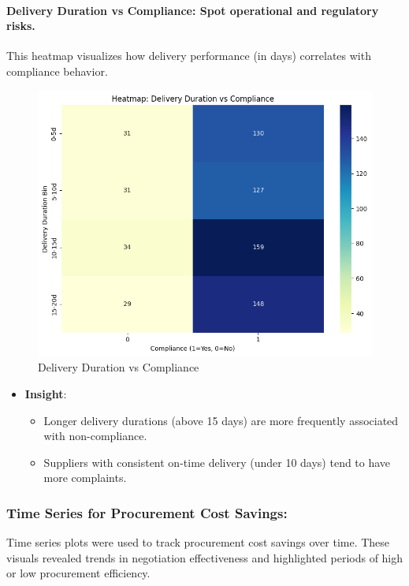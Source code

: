 \documentclass[10pt, twocolumn]{article}
\begin{document}
\paragraph{Delivery Duration vs Compliance: Spot operational and regulatory risks.} 
This heatmap visualizes how delivery performance (in days) correlates with compliance behavior.
\begin{figure}[H]
    \centering
    \includegraphics[width=1\linewidth]{Images/heatmap_delivery_vs_compliance.png}
    \caption{Delivery Duration vs Compliance}
    \label{fig:heatmap_delivery_vs_compliance}
\end{figure}
\begin{itemize}
    \item \textbf{Insight}:
    \begin{itemize}
        \item Longer delivery durations (above 15 days) are more frequently associated with non-compliance.
        \item Suppliers with consistent on-time delivery (under 10 days) tend to have more complaints.
    \end{itemize}
\end{itemize}


\subsubsection{Time Series for Procurement Cost Savings:} Time series plots were used to track procurement cost savings over time. These visuals revealed trends in negotiation effectiveness and highlighted periods of high or low procurement efficiency.
\end{document}
